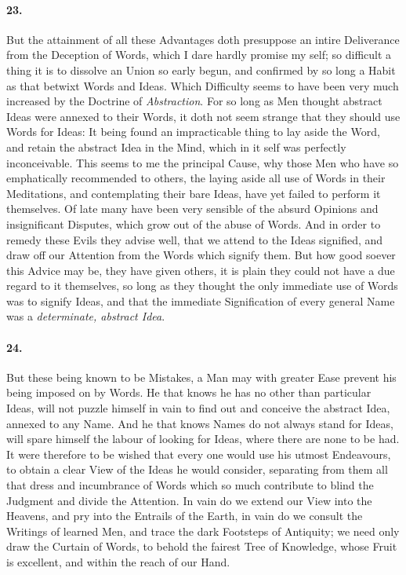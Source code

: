 \documentclass[]{article}
\newenvironment{sectionbody}{\begin{multicols}{2}}{\end{multicols}}
\begin{document}
\begin{sectionbody}
\paragraph{23.} But the attainment of all these Advantages doth presuppose an
intire Deliverance from the Deception of Words, which I dare
hardly promise my self; so difficult a thing it is to dissolve an
Union so early begun, and confirmed by so long a Habit as that
betwixt Words and Ideas.  Which Difficulty seems to have been
very much increased by the Doctrine of \emph{Abstraction}.  For
so long as Men thought abstract Ideas were annexed to their
Words, it doth not seem strange that they should use Words for
Ideas: It being found an impracticable thing to lay aside the
Word, and retain the abstract Idea in the Mind, which in it self
was perfectly inconceivable.  This seems to me the principal
Cause, why those Men who have so emphatically recommended to
others, the laying aside all use of Words in their Meditations,
and contemplating their bare Ideas, have yet failed to perform it
themselves.  Of late many have been very sensible of the absurd
Opinions and insignificant Disputes, which grow out of the abuse
of Words.  And in order to remedy these Evils they advise well,
that we attend to the Ideas signified, and draw off our Attention
from the Words which signify them.  But how good soever this
Advice may be, they have given others, it is plain they could not
have a due regard to it themselves, so long as they thought the
only immediate use of Words was to signify Ideas, and that the
immediate Signification of every general Name was a
\emph{determinate, abstract Idea}.



\paragraph{24.} But these being known to be Mistakes, a Man may with greater Ease
prevent his being imposed on by Words.  He that knows he has no
other than particular Ideas, will not puzzle himself in vain to
find out and conceive the abstract Idea, annexed to any Name.
And he that knows Names do not always stand for Ideas, will spare
himself the labour of looking for Ideas, where there are none to
be had.  It were therefore to be wished that every one would use
his utmost Endeavours, to obtain a clear View of the Ideas he
would consider, separating from them all that dress and
incumbrance of Words which so much contribute to blind the
Judgment and divide the Attention.  In vain do we extend our View
into the Heavens, and pry into the Entrails of the Earth, in vain
do we consult the Writings of learned Men, and trace the dark
Footsteps of Antiquity; we need only draw the Curtain of Words,
to behold the fairest Tree of Knowledge, whose Fruit is
excellent, and within the reach of our Hand.




\end{sectionbody}
\end{document}
